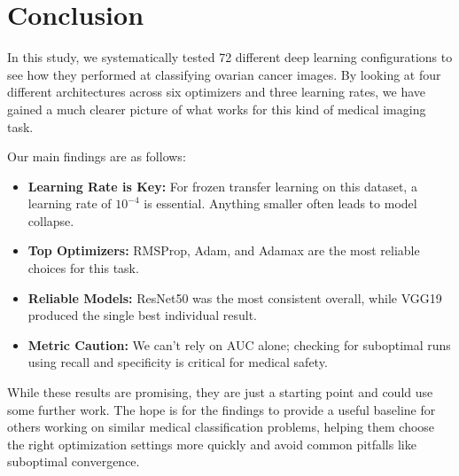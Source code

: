 \section{Conclusion}
\label{sec:conclusion}

In this study, we systematically tested 72 different deep learning configurations to see how they performed at classifying ovarian cancer images. By looking at four different architectures across six optimizers and three learning rates, we have gained a much clearer picture of what works for this kind of medical imaging task.

Our main findings are as follows:
\begin{itemize}
    \item \textbf{Learning Rate is Key:} For frozen transfer learning on this dataset, a learning rate of $10^{-4}$ is essential. Anything smaller often leads to model collapse.
    \item \textbf{Top Optimizers:} RMSProp, Adam, and Adamax are the most reliable choices for this task.
    \item \textbf{Reliable Models:} ResNet50 was the most consistent overall, while VGG19 produced the single best individual result.
    \item \textbf{Metric Caution:} We can't rely on AUC alone; checking for suboptimal runs using recall and specificity is critical for medical safety.
\end{itemize}

While these results are promising, they are just a starting point and could use some further work. The hope is for the findings to provide a useful baseline for others working on similar medical classification problems, helping them choose the right optimization settings more quickly and avoid common pitfalls like suboptimal convergence.
